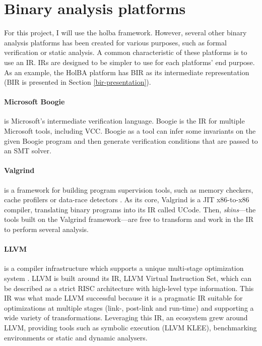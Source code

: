 \documentclass{kththesis}
\begin{document}

\section{Binary analysis platforms}

For this project, I will use the \gls{holba} framework. However, several other binary analysis platforms has been created for various purposes, such as formal verification or static analysis. A common characteristic of these platforms is to use an \gls{IR}. IRs are designed to be simpler to use for each platforms' end purpose. As an example, the HolBA platform has BIR as its intermediate representation (BIR is presented in Section \ref{bir-presentation}).

\paragraph{Microsoft Boogie} is Microsoft's intermediate verification language. Boogie is the IR for multiple Microsoft tools, including VCC. Boogie as a tool can infer some invariants on the given Boogie program and then generate verification conditions that are passed to an SMT solver\footnotemark.


\paragraph{Valgrind} is a framework for building program supervision tools, such as memory checkers, cache profilers or data-race detectors
\cite{nethercote_valgrind:_2003}. As its core, Valgrind is a JIT x86-to-x86 compiler, translating binary programs into its IR called UCode. Then, \textit{skins}---the tools built on the Valgrind framework---are free to transform and work in the IR to perform several analysis.

\paragraph{LLVM} is a compiler infrastructure which supports a unique multi-stage optimization system \cite{lattner_llvm:_2002}. LLVM is built around its \gls{IR}, LLVM Virtual Instruction Set, which can be described as a strict RISC architecture with high-level type information. This IR was what made LLVM successful because it is a pragmatic IR suitable for optimizations at multiple stages (link-, post-link and run-time) and supporting a wide variety of transformations. Leveraging this IR, an ecosystem grew around LLVM, providing tools such as symbolic execution (LLVM KLEE), benchmarking environments or static and dynamic analysers.
\end{document}
